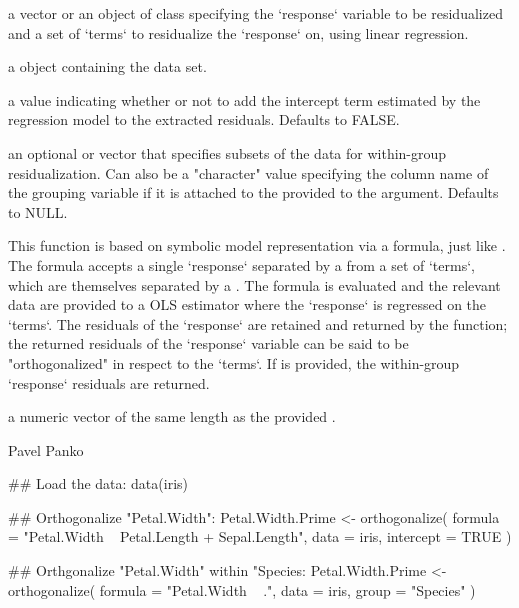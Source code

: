 \documentclass[a4paper]{book}
\begin{document}
\begin{Arguments}
\begin{ldescription}
\item[\code{formula}] 
a  vector or an object of class  specifying the `response`
variable to be residualized and a set of `terms` to residualize the
`response` on, using linear regression. 

\item[\code{data}] 
a  object containing the data set.  

\item[\code{intercept}] 
a  value indicating whether or not to 
add the intercept term estimated by the regression model to the
extracted residuals. Defaults to FALSE.

\item[\code{group}] 
an optional  or  vector that
specifies subsets of the data for within-group residualization. Can
also be a "character" value specifying the column name of the
grouping variable if it is attached to the 
provided to the  argument. Defaults to NULL.  

\end{ldescription}
\end{Arguments}
%
\begin{Details}\relax
This function is based on symbolic model
representation via a formula, just like . The
formula accepts a single `response` separated by a  from a set of `terms`, which are
themselves separated by a \code{+}. The formula is evaluated and the
relevant data are provided to a OLS estimator where the `response`
is regressed on the `terms`. The residuals of the `response` are 
retained and returned by the function; the returned residuals of the
`response` variable can be said to be "orthogonalized" in respect to the `terms`. 
If  is provided, the within-group `response` residuals
are returned. 
\end{Details}
%
\begin{Value}
a numeric vector of the same length as the provided . 
\end{Value}
%
\begin{Author}\relax
Pavel Panko
\end{Author}
%
\begin{Examples}
\begin{ExampleCode}
## Load the data:
data(iris)

## Orthogonalize "Petal.Width":
Petal.Width.Prime <- orthogonalize(
	formula   = "Petal.Width ~ Petal.Length + Sepal.Length", 
	data      = iris, 
	intercept = TRUE
)

## Orthgonalize "Petal.Width" within "Species:
Petal.Width.Prime <- orthogonalize(
	formula = "Petal.Width ~ .", 
	data    = iris, 
	group   = "Species" 
)
\end{ExampleCode}
\end{Examples}
\printindex{}
\end{document}
